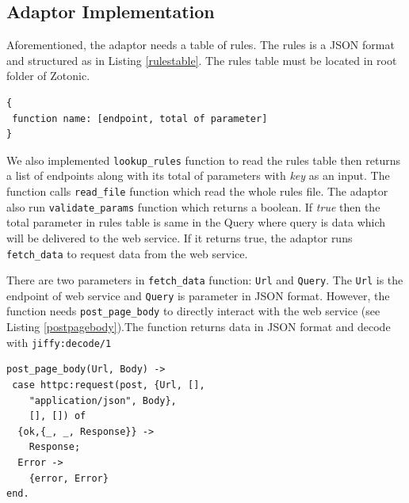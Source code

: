 \documentclass[conference]{IEEEtran}
\begin{document}
\subsection{Adaptor Implementation}
Aforementioned, the adaptor needs a table of rules. The rules is a JSON format and structured as in Listing \ref{rulestable}. The rules table must be located in root folder of Zotonic. 

\begin{lstlisting}[caption=Structure of Rules, label=rulestable]
{
 function name: [endpoint, total of parameter]
}
\end{lstlisting}

We also implemented \texttt{lookup\_rules} function to read the rules table then returns a list of endpoints along with its total of parameters with \textit{key} as an input. The function calls \texttt{read\_file} function which read the whole rules file. The adaptor also run \texttt{validate\_params} function which returns a boolean. If \textit{true} then the total parameter in rules table is same in the Query where query is data which will be delivered to the web service. If it returns true, the adaptor runs \texttt{fetch\_data} to request data from the web service. 


There are two parameters in \texttt{fetch\_data} function: \texttt{Url} and \texttt{Query}. The \texttt{Url} is the endpoint of web service and \texttt{Query} is parameter in JSON format. However, the function needs \texttt{post\_page\_body} to directly interact with the web service (see Listing \ref{postpagebody}).The function returns data in JSON format and decode with \texttt{jiffy:decode/1} 

\begin{lstlisting}[caption=Implementation of post\_page\_body function, label=postpagebody]
post_page_body(Url, Body) ->
 case httpc:request(post, {Url, [], 
    "application/json", Body},
    [], []) of
  {ok,{_, _, Response}} ->
    Response;
  Error ->
    {error, Error}
end.
\end{lstlisting} 
\end{document}
